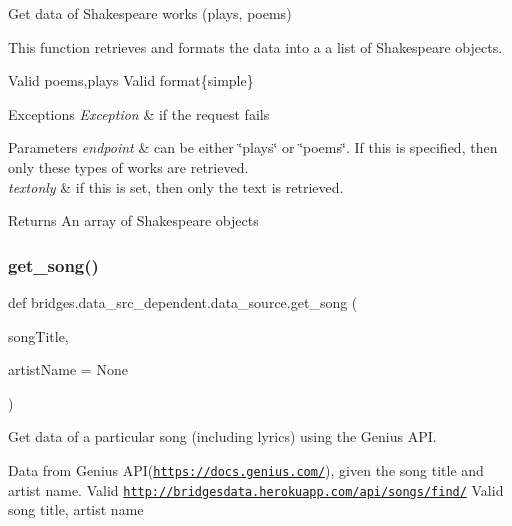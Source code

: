 Get data of Shakespeare works (plays, poems) 

This function retrieves and formats the data into a a list of Shakespeare objects.

Valid \textquotesingle{}poems\textquotesingle{},\textquotesingle{}plays\textquotesingle{} Valid format\{simple\}


\begin{DoxyExceptions}{Exceptions}
{\em Exception} & if the request fails\\
\hline
\end{DoxyExceptions}

\begin{DoxyParams}{Parameters}
{\em endpoint} & can be either \char`\"{}plays\char`\"{} or \char`\"{}poems\char`\"{}. If this is specified, then only these types of works are retrieved. \\
\hline
{\em textonly} & if this is set, then only the text is retrieved.\\
\hline
\end{DoxyParams}
\begin{DoxyReturn}{Returns}
An array of Shakespeare objects 
\end{DoxyReturn}
\mbox{\label{namespacebridges_1_1data__src__dependent_1_1data__source_a060ab8ec1777a5458a37d5e01e594e82}} 
\subsubsection{\texorpdfstring{get\+\_\+song()}{get\_song()}}
{\footnotesize\ttfamily def bridges.\+data\+\_\+src\+\_\+dependent.\+data\+\_\+source.\+get\+\_\+song (\begin{DoxyParamCaption}\item[{}]{song\+Title,  }\item[{}]{artist\+Name = {\ttfamily None} }\end{DoxyParamCaption})}



Get data of a particular song (including lyrics) using the Genius A\+PI. 

Data from Genius A\+PI(\href{https://docs.genius.com/}{\tt https\+://docs.\+genius.\+com/}), given the song title and artist name. Valid \href{http://bridgesdata.herokuapp.com/api/songs/find/}{\tt http\+://bridgesdata.\+herokuapp.\+com/api/songs/find/} Valid song title, artist name

